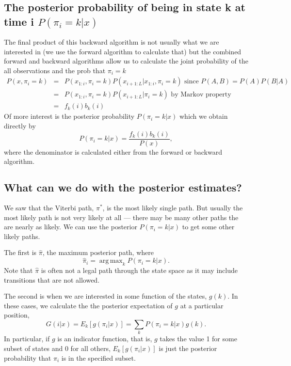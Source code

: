 \documentclass[11pt]{article}
\DeclareMathOperator*{\argmax}{arg\,max}
\begin{document}
\subsection{The posterior probability of being in state k at time i $P(\pi_i = k|x)$} \label{sec:probstate}


The final product of this backward algorithm is not usually what we are interested in (we use the forward algorithm to calculate that) but the combined forward and backward algorithms allow us to calculate  the joint  probability  of the all observations and the prob that $\pi_i = k$ 
\begin{eqnarray*}
P(x,\pi_i = k) & =  & P(x_{1:i},\pi_i = k)P(x_{i+1:L}|x_{1:i},\pi_i = k) \mbox{ since } P(A,B) = P(A)P(B|A)\\
 & = &  P(x_{1:i},\pi_i = k)P(x_{i+1:L}|\pi_i = k) \mbox{ by Markov property} \\
 & = &  f_k(i)b_k(i)
\end{eqnarray*}
Of more interest is the posterior probability $P(\pi_i = k | x)$ which we obtain directly by 
\[P(\pi_i = k | x) = \frac{ f_k(i)b_k(i)}{P(x)}, \]
where the denominator is calculated either from the forward or backward algorithm.





\subsection{What can we do with the posterior estimates?}

We saw that the Viterbi path, $\pi^*$, is the most likely single path.  But usually the most likely path is not very likely at all --- there may be many other paths the are nearly as likely.  We can use the posterior $P(\pi_i = k | x)$ to get some other likely paths.

The first is $\hat \pi$, the maximum posterior path, where \[\hat \pi_i =  \argmax_k P(\pi_i = k|x). \]
Note that $\hat \pi$ is often not a legal path through the state space as it may include transitions that are not allowed.

The second is when we are interested in some function of the states, $g(k)$.  In these cases, we calculate the the posterior expectation of $g$ at a particular position, \[G(i|x) = E_k[g(\pi_i |x)] = \sum_k P(\pi_i = k|x)g(k).\]  In particular, if $g$ is an indicator function, that is, $g$ takes the value 1 for some subset of states and 0 for all others, $E_k[g(\pi_i |x)] $ is just the posterior probability that $\pi_i$ is in the specified subset.
\end{document}
